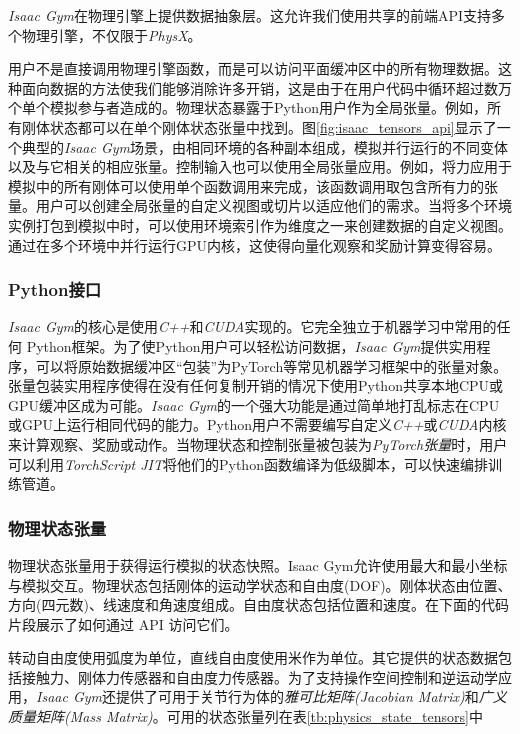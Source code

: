 \emph{Isaac Gym}在物理引擎上提供数据抽象层。这允许我们使用共享的前端API支持多个物理引擎，不仅限于\emph{PhysX}。

用户不是直接调用物理引擎函数，而是可以访问平面缓冲区中的所有物理数据。这种面向数据的方法使我们能够消除许多开销，这是由于在用户代码中循环超过数万个单个模拟参与者造成的。物理状态暴露于Python用户作为全局张量。例如，所有刚体状态都可以在单个刚体状态张量中找到。图\ref{fig:isaac_tensors_api}显示了一个典型的\emph{Isaac Gym}场景，由相同环境的各种副本组成，模拟并行运行的不同变体以及与它相关的相应张量。控制输入也可以使用全局张量应用。例如，将力应用于模拟中的所有刚体可以使用单个函数调用来完成，该函数调用取包含所有力的张量。用户可以创建全局张量的自定义视图或切片以适应他们的需求。当将多个环境实例打包到模拟中时，可以使用环境索引作为维度之一来创建数据的自定义视图。通过在多个环境中并行运行GPU内核，这使得向量化观察和奖励计算变得容易。


\subsubsection[Python接口]{Python接口}
\emph{Isaac Gym}的核心是使用\emph{C++}和\emph{CUDA}实现的。它完全独立于机器学习中常用的任何 Python框架。为了使Python用户可以轻松访问数据，\emph{Isaac Gym}提供实用程序，可以将原始数据缓冲区“包装”为PyTorch等常见机器学习框架中的张量对象。张量包装实用程序使得在没有任何复制开销的情况下使用Python共享本地CPU或GPU缓冲区成为可能。\emph{Isaac Gym}的一个强大功能是通过简单地打乱标志在CPU或GPU上运行相同代码的能力。Python用户不需要编写自定义\emph{C++}或\emph{CUDA}内核来计算观察、奖励或动作。当物理状态和控制张量被包装为\emph{PyTorch张量}时，用户可以利用\emph{TorchScript JIT}将他们的Python函数编译为低级脚本，可以快速编排训练管道。

\subsubsection[物理状态张量]{物理状态张量\label{section:physics_state_tensors}}
物理状态张量用于获得运行模拟的状态快照。Isaac Gym允许使用最大和最小坐标与模拟交互。物理状态包括刚体的运动学状态和自由度(DOF)。刚体状态由位置、方向(四元数)、线速度和角速度组成。自由度状态包括位置和速度。在下面的代码片段展示了如何通过 API 访问它们。

转动自由度使用弧度为单位，直线自由度使用米作为单位。其它提供的状态数据包括接触力、刚体力传感器和自由度力传感器。为了支持操作空间控制和逆运动学应用，\emph{Isaac Gym}还提供了可用于关节行为体的\emph{雅可比矩阵(Jacobian Matrix)}和\emph{广义质量矩阵(Mass Matrix)}。可用的状态张量列在表\ref{tb:physics_state_tensors}中

